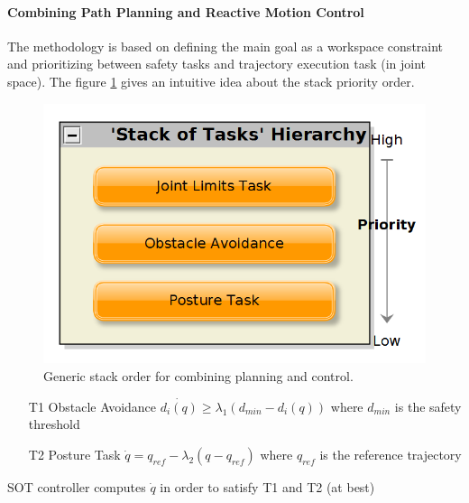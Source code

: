 



\paragraph{Combining Path Planning and Reactive Motion Control}

The methodology is based on defining the main goal as a workspace constraint and prioritizing between safety tasks and trajectory execution task (in joint space). The figure \ref{gso} gives an intuitive idea about the stack priority order.

   \begin{figure}[H]
      \centering
      \includegraphics[scale=0.5]{chapters/doa/images/sot_hierarchy.png}
      \caption{Generic stack order for combining planning and control. }
      \label{gso}
   \end{figure}
   \begin{itemize}
  \item[T1] Obstacle Avoidance
  \newline
\hspace*{0.1cm}$\dot{d_i(q)} \geq \lambda_{1}(d_{min} - d_i(q))$\newline
\hspace*{0.11cm}where $d_{min}$ is the safety threshold
  \item[T2] Posture Task
  \newline
\hspace*{0.1cm}$\dot{q} = q_{ref} - \lambda_{2}(q-q_{ref})$\newline
\hspace*{0.1cm}where $q_{ref}$ is the reference trajectory
\end{itemize}
SOT controller computes $\dot{q}$ in order to satisfy T1 and T2 (at best)



